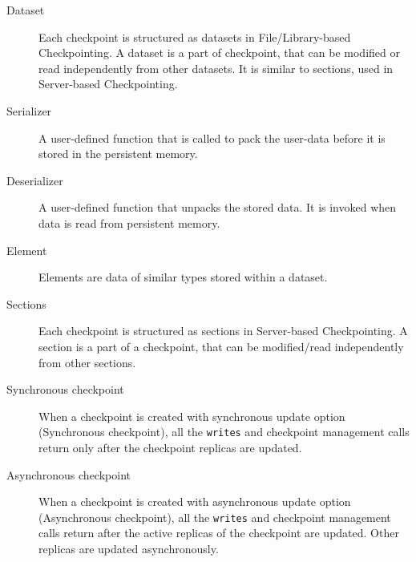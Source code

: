 \begin{flushleft}
\begin{Desc}
\begin{description}
\item[Dataset] Each checkpoint is structured as datasets in File/Library-based Checkpointing. A dataset is a part of
           checkpoint, that can be modified or read independently from other datasets. It is 
           similar to sections, used in Server-based Checkpointing.
\end{description}
\begin{description}

\item[Serializer] A user-defined function that is called to pack the user-data before it is stored in the persistent memory.
 \end{description}
\begin{description}

\item[Deserializer] A user-defined function that unpacks the stored data. It is invoked when data is read from persistent memory.
\end{description}
\begin{description}

\item[Element] Elements are data of similar types stored within a dataset.
\end{description}
\begin{description}

\item[Sections] Each checkpoint is structured as sections in Server-based Checkpointing. A section is a part of a
            checkpoint, that can be modified/read independently from other sections.

\end{description}
\begin{description}

\item[Synchronous checkpoint] When a checkpoint is created with 
            synchronous update option (Synchronous checkpoint), all the {\tt{writes}} and
            checkpoint management calls return only after the checkpoint replicas are updated.

\end{description}
\begin{description}

\item[Asynchronous checkpoint] When a checkpoint is created with 
            asynchronous update option (Asynchronous checkpoint), all the {\tt{writes}} and
            checkpoint management calls return after the active replicas
            of the checkpoint are updated. Other replicas are updated asynchronously.


\end{description}
\end{Desc}
\end{flushleft}
